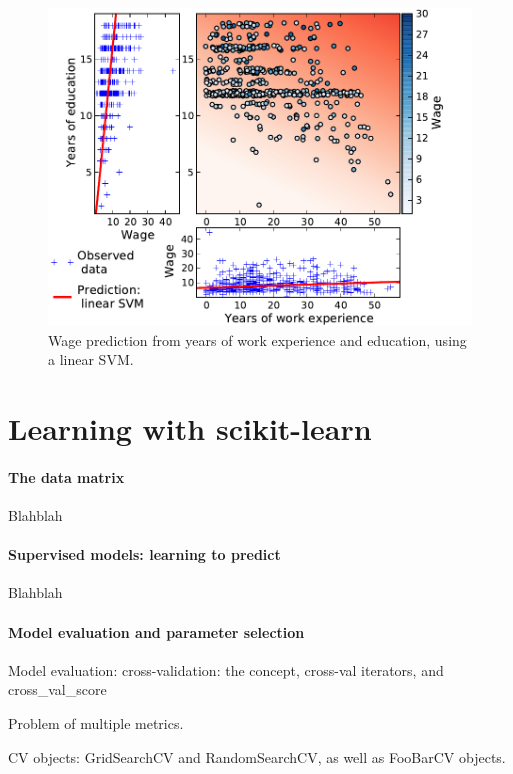 \documentclass[a4paper]{article}
\begin{document}
\begin{figure}[b]
    \hspace*{-.015\linewidth}%
    \includegraphics[width=1.05\linewidth]{wage_data_linear_svm}%

    \caption{Wage prediction from years of work experience and education,
    using a linear SVM.\label{fig:linear_svm}}
\end{figure}

\section{Learning with scikit-learn}

\paragraph{The data matrix}
%
Blahblah

\paragraph{Supervised models: learning to predict}
%
Blahblah

\paragraph{Model evaluation and parameter selection}
%
Model evaluation:
cross-validation: the concept, cross-val iterators, and cross\_val\_score

Problem of multiple metrics.

CV objects: GridSearchCV and RandomSearchCV, as well as FooBarCV objects.
\end{document}
